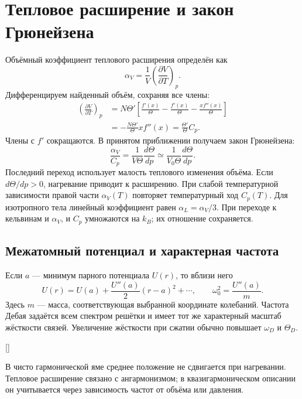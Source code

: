 \documentclass[../final.tex]{subfiles}
\begin{document}
\clearpage
\section{Тепловое расширение и закон Грюнейзена}
Объёмный коэффициент теплового расширения определён как
\begin{equation*}
 \alpha_V=\frac1V\left(\frac{\partial V}{\partial T}\right)_p.
\end{equation*}
Дифференцируем найденный объём, сохраняя все члены:
\begin{align*}
 \left(\frac{\partial V}{\partial T}\right)_p
 &=N\Theta'\left[\frac{f'(x)}\Theta
 -\frac{f'(x)}\Theta-\frac{x f''(x)}\Theta\right]\\
 &=-\frac{N\Theta'}\Theta x f''(x)
 =\frac{\Theta'}\Theta C_p.
\end{align*}
Члены с $f'$ сокращаются. В принятом приближении получаем закон Грюнейзена:
\begin{equation*}
 \boxed{\quad \frac{\alpha_V}{C_p}
 =\frac1{V\Theta}\frac{d\Theta}{dp}
 \simeq\frac1{V_0\Theta}\frac{d\Theta}{dp}.\quad}
\end{equation*}
Последний переход использует малость теплового изменения объёма.
Если $d\Theta/dp>0$, нагревание приводит к расширению.
При слабой температурной зависимости правой части $\alpha_V(T)$
повторяет температурный ход $C_p(T)$.
Для изотропного тела линейный коэффициент равен $\alpha_L=\alpha_V/3$.
При переходе к кельвинам и $\alpha_V$, и $C_p$ умножаются на $k_B$;
их отношение сохраняется.

\subsection{Межатомный потенциал и характерная частота}
Если $a$ --- минимум парного потенциала $U(r)$, то вблизи него
\begin{equation*}
 U(r)=U(a)+\frac{U''(a)}2(r-a)^2+\cdots,\qquad
 \omega_0^2=\frac{U''(a)}m.
\end{equation*}
Здесь $m$ --- масса, соответствующая выбранной координате колебаний.
Частота Дебая задаётся всем спектром решётки и имеет тот же характерный
масштаб жёсткости связей. Увеличение жёсткости при сжатии обычно повышает
$\omega_D$ и $\Theta_D$.

\begin{rbox}[unbreakable,left=14pt,right=14pt,top=8pt,bottom=6pt]{[]}
\centering
\captionsetup{font=footnotesize,hypcap=false,skip=5pt}
\end{rbox}
В чисто гармонической яме среднее положение не сдвигается при нагревании.
Тепловое расширение связано с ангармонизмом; в квазигармоническом описании
он учитывается через зависимость частот от объёма или давления.
\end{document}
